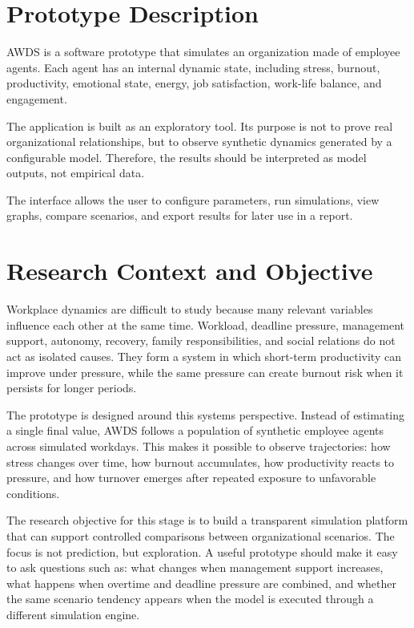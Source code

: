 \documentclass[12pt,a4paper]{article}
\begin{document}
\tableofcontents
\newpage

\section{Prototype Description}

AWDS is a software prototype that simulates an organization made of employee agents. Each agent has an internal dynamic state, including stress, burnout, productivity, emotional state, energy, job satisfaction, work-life balance, and engagement.

The application is built as an exploratory tool. Its purpose is not to prove real organizational relationships, but to observe synthetic dynamics generated by a configurable model. Therefore, the results should be interpreted as model outputs, not empirical data.

The interface allows the user to configure parameters, run simulations, view graphs, compare scenarios, and export results for later use in a report.

\section{Research Context and Objective}

Workplace dynamics are difficult to study because many relevant variables influence each other at the same time. Workload, deadline pressure, management support, autonomy, recovery, family responsibilities, and social relations do not act as isolated causes. They form a system in which short-term productivity can improve under pressure, while the same pressure can create burnout risk when it persists for longer periods.

The prototype is designed around this systems perspective. Instead of estimating a single final value, AWDS follows a population of synthetic employee agents across simulated workdays. This makes it possible to observe trajectories: how stress changes over time, how burnout accumulates, how productivity reacts to pressure, and how turnover emerges after repeated exposure to unfavorable conditions.

The research objective for this stage is to build a transparent simulation platform that can support controlled comparisons between organizational scenarios. The focus is not prediction, but exploration. A useful prototype should make it easy to ask questions such as: what changes when management support increases, what happens when overtime and deadline pressure are combined, and whether the same scenario tendency appears when the model is executed through a different simulation engine.
\end{document}
